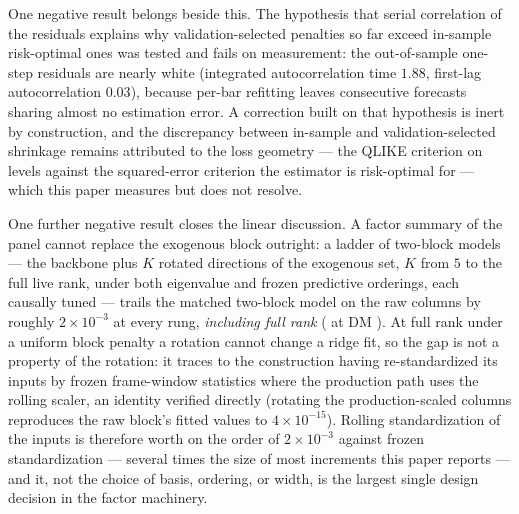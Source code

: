 One negative result belongs beside this. The hypothesis that serial
correlation of the residuals explains why validation-selected penalties
so far exceed in-sample risk-optimal ones was tested and fails on
measurement: the out-of-sample one-step residuals are nearly white
(integrated autocorrelation time $1.88$, first-lag autocorrelation
$0.03$), because per-bar refitting leaves consecutive forecasts sharing
almost no estimation error. A correction built on that hypothesis is
inert by construction, and the discrepancy between in-sample and
validation-selected shrinkage remains attributed to the loss geometry
--- the QLIKE criterion on levels against the squared-error criterion
the estimator is risk-optimal for --- which this paper measures but
does not resolve.

One further negative result closes the linear discussion. A factor
summary of the panel cannot replace the exogenous block outright: a
ladder of two-block models --- the backbone plus $K$ rotated directions
of the exogenous set, $K$ from $5$ to the full live rank, under both
eigenvalue and frozen predictive orderings, each causally tuned ---
trails the matched two-block model on the raw columns by roughly
$2 \times 10^{-3}$ at every rung, \emph{including full rank}
(\unifIncrBlkTwoRotVarFullKTunedDQ{} at DM
\unifIncrBlkTwoRotVarFullKTunedDM{}). At full rank under a uniform block
penalty a rotation cannot change a ridge fit, so the gap is not a
property of the rotation: it traces to the construction having
re-standardized its inputs by frozen frame-window statistics where the
production path uses the rolling scaler, an identity verified directly
(rotating the production-scaled columns reproduces the raw block's
fitted values to $4 \times 10^{-15}$). Rolling standardization of the
inputs is therefore worth on the order of $2 \times 10^{-3}$ against
frozen standardization --- several times the size of most increments
this paper reports --- and it, not the choice of basis, ordering, or
width, is the largest single design decision in the factor machinery.
